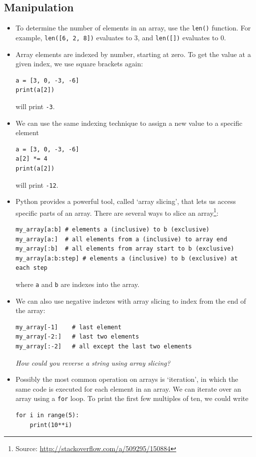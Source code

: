 \documentclass[a4paper,twoside]{memoir}
\newcommand{\shellcmd}{\texttt}
\begin{document}
\subsection{Manipulation}
\begin{itemize}
\item To determine the number of elements in an array, use the \shellcmd{len()} function.  For example, \shellcmd{len([6, 2, 8])} evaluates to 3, and \shellcmd{len([])} evaluates to 0.
\item Array elements are indexed by number, starting at zero.  To get the value at a given index, we use square brackets again:
\begin{verbatim}
a = [3, 0, -3, -6]
print(a[2])
\end{verbatim}
will print \shellcmd{-3}.

\item We can use the same indexing technique to assign a new value to a specific element
\begin{verbatim}
a = [3, 0, -3, -6]
a[2] *= 4
print(a[2])
\end{verbatim}
will print \shellcmd{-12}.

\item Python provides a powerful tool, called `array slicing', that lets us access specific parts of an array.  There are several ways to slice an array\footnote{Source: \url{http://stackoverflow.com/a/509295/150884}}:
\begin{verbatim}
my_array[a:b] # elements a (inclusive) to b (exclusive)
my_array[a:]  # all elements from a (inclusive) to array end
my_array[:b]  # all elements from array start to b (exclusive)
my_array[a:b:step] # elements a (inclusive) to b (exclusive) at each step
\end{verbatim}
where \shellcmd{a} and \shellcmd{b} are indexes into the array.
\item We can also use negative indexes with array slicing to index from the end of the array:
\begin{verbatim}
my_array[-1]    # last element
my_array[-2:]   # last two elements
my_array[:-2]   # all except the last two elements
\end{verbatim}
\textit{How could you reverse a string using array slicing?}

\item Possibly the most common operation on arrays is `iteration', in which the same code is executed for each element in an array.  We can iterate over an array using a \shellcmd{for} loop.  To print the first few multiples of ten, we could write
\begin{verbatim}
for i in range(5):
	print(10**i)
\end{verbatim}
\end{itemize}
\end{document}
